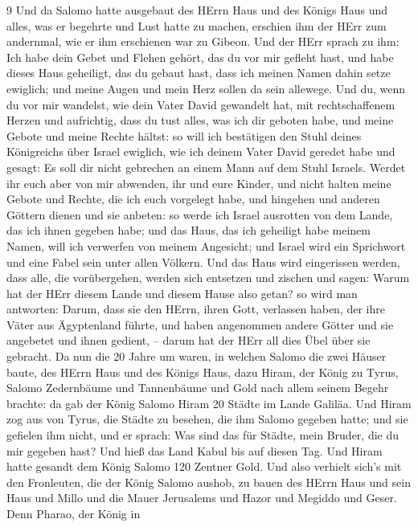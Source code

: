9  Und da Salomo hatte ausgebaut des HErrn Haus und des
Königs Haus und alles, was er begehrte und Lust hatte zu machen,
 erschien ihm der HErr zum andernmal, wie er ihm erschienen
war zu Gibeon.  Und der HErr sprach zu ihm: Ich habe dein
Gebet und Flehen gehört, das du vor mir gefleht hast, und habe dieses
Haus geheiligt, das du gebaut hast, dass ich meinen Namen dahin setze
ewiglich; und meine Augen und mein Herz sollen da sein allewege.
 Und du, wenn du vor mir wandelst, wie dein Vater David
gewandelt hat, mit rechtschaffenem Herzen und aufrichtig, dass du tust
alles, was ich dir geboten habe, und meine Gebote und meine Rechte
hältst:  so will ich bestätigen den Stuhl deines Königreichs
über Israel ewiglich, wie ich deinem Vater David geredet habe und
gesagt: Es soll dir nicht gebrechen an einem Mann auf dem Stuhl Israels.
 Werdet ihr euch aber von mir abwenden, ihr und eure Kinder,
und nicht halten meine Gebote und Rechte, die ich euch vorgelegt habe,
und hingehen und anderen Göttern dienen und sie anbeten:  so
werde ich Israel ausrotten von dem Lande, das ich ihnen gegeben habe;
und das Haus, das ich geheiligt habe meinem Namen, will ich verwerfen
von meinem Angesicht; und Israel wird ein Sprichwort und eine Fabel sein
unter allen Völkern.  Und das Haus wird eingerissen werden,
dass alle, die vorübergehen, werden sich entsetzen und zischen und
sagen: Warum hat der HErr diesem Lande und diesem Hause also getan?
 so wird man antworten: Darum, dass sie den HErrn, ihren
Gott, verlassen haben, der ihre Väter aus Ägyptenland führte, und haben
angenommen andere Götter und sie angebetet und ihnen gedient, -- darum
hat der HErr all dies Übel über sie gebracht.  Da nun die
20 Jahre um waren, in welchen Salomo die zwei Häuser baute, des HErrn
Haus und des Königs Haus,  dazu Hiram, der König zu Tyrus,
Salomo Zedernbäume und Tannenbäume und Gold nach allem seinem Begehr
brachte: da gab der König Salomo Hiram 20 Städte im Lande Galiläa.
 Und Hiram zog aus von Tyrus, die Städte zu besehen, die
ihm Salomo gegeben hatte; und sie gefielen ihm nicht,  und
er sprach: Was sind das für Städte, mein Bruder, die du mir gegeben
hast? Und hieß das Land Kabul bis auf diesen Tag.  Und
Hiram hatte gesandt dem König Salomo 120 Zentner Gold.  Und
also verhielt sich's mit den Fronleuten, die der König Salomo aushob, zu
bauen des HErrn Haus und sein Haus und Millo und die Mauer Jerusalems
und Hazor und Megiddo und Geser.  Denn Pharao, der König in
